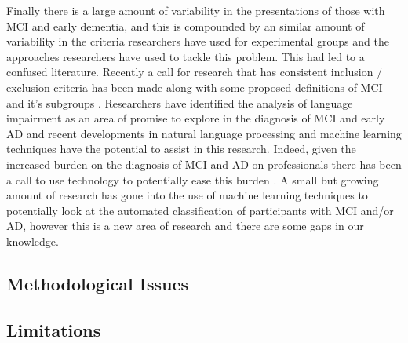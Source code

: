 \documentclass[12pt]{article}
\begin{document}
Finally there is a large amount of variability in the presentations of those with MCI and early dementia, and this is compounded by an similar amount of variability in the criteria researchers have used for experimental groups and the approaches researchers have used to tackle this problem. This had led to a confused literature. Recently a call for research that has consistent inclusion / exclusion criteria has been made along with some proposed definitions of MCI and it's subgroups \cite{Petersen2014}. Researchers have identified the analysis of language impairment as an area of promise to explore in the diagnosis of MCI and early AD and recent developments in natural language processing and machine learning techniques have the potential to assist in this research. Indeed, given the increased burden on the diagnosis of MCI and AD on professionals there has been a call to use technology to potentially ease this burden \cite{Boschi2017}. A small but growing amount of research has gone into the use of machine learning techniques to potentially look at the automated classification of participants with MCI and/or AD, however this is a new area of research and there are some gaps in our knowledge.

\subsection{Methodological Issues}
\subsection{Limitations}
\end{document}
